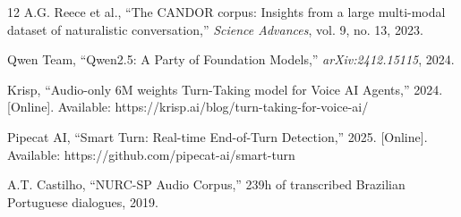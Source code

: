 \documentclass[conference]{IEEEtran}
\begin{document}
\begin{thebibliography}{12}
A.G. Reece et al.,
``The CANDOR corpus: Insights from a large multi-modal dataset of naturalistic conversation,''
\textit{Science Advances}, vol. 9, no. 13, 2023.

Qwen Team,
``Qwen2.5: A Party of Foundation Models,''
\textit{arXiv:2412.15115}, 2024.

Krisp,
``Audio-only 6M weights Turn-Taking model for Voice AI Agents,''
2024. [Online]. Available: https://krisp.ai/blog/turn-taking-for-voice-ai/

Pipecat AI,
``Smart Turn: Real-time End-of-Turn Detection,''
2025. [Online]. Available: https://github.com/pipecat-ai/smart-turn

A.T. Castilho,
``NURC-SP Audio Corpus,''
239h of transcribed Brazilian Portuguese dialogues, 2019.

\end{thebibliography}
\end{document}
